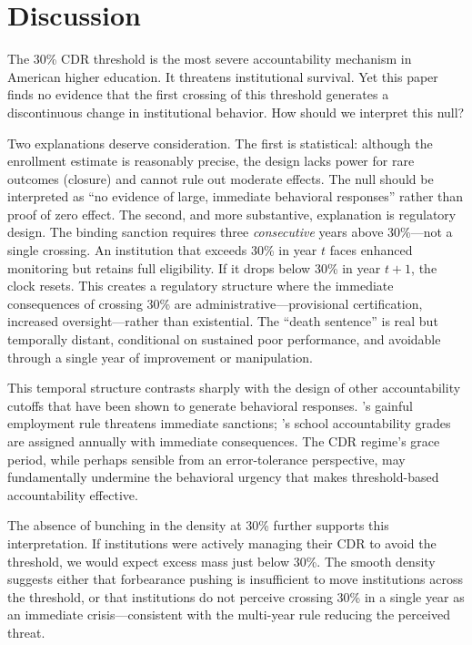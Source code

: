 \documentclass[12pt]{article}
\begin{document}
\section{Discussion}

The 30\% CDR threshold is the most severe accountability mechanism in American higher education. It threatens institutional survival. Yet this paper finds no evidence that the first crossing of this threshold generates a discontinuous change in institutional behavior. How should we interpret this null?

Two explanations deserve consideration. The first is statistical: although the enrollment estimate is reasonably precise, the design lacks power for rare outcomes (closure) and cannot rule out moderate effects. The null should be interpreted as ``no evidence of large, immediate behavioral responses'' rather than proof of zero effect. The second, and more substantive, explanation is regulatory design. The binding sanction requires three \textit{consecutive} years above 30\%---not a single crossing. An institution that exceeds 30\% in year $t$ faces enhanced monitoring but retains full eligibility. If it drops below 30\% in year $t+1$, the clock resets. This creates a regulatory structure where the immediate consequences of crossing 30\% are administrative---provisional certification, increased oversight---rather than existential. The ``death sentence'' is real but temporally distant, conditional on sustained poor performance, and avoidable through a single year of improvement or manipulation.

This temporal structure contrasts sharply with the design of other accountability cutoffs that have been shown to generate behavioral responses. \citet{cellini2019}'s gainful employment rule threatens immediate sanctions; \citet{figlio2006}'s school accountability grades are assigned annually with immediate consequences. The CDR regime's grace period, while perhaps sensible from an error-tolerance perspective, may fundamentally undermine the behavioral urgency that makes threshold-based accountability effective.

The absence of bunching in the density at 30\% further supports this interpretation. If institutions were actively managing their CDR to avoid the threshold, we would expect excess mass just below 30\%. The smooth density suggests either that forbearance pushing is insufficient to move institutions across the threshold, or that institutions do not perceive crossing 30\% in a single year as an immediate crisis---consistent with the multi-year rule reducing the perceived threat.
\end{document}
